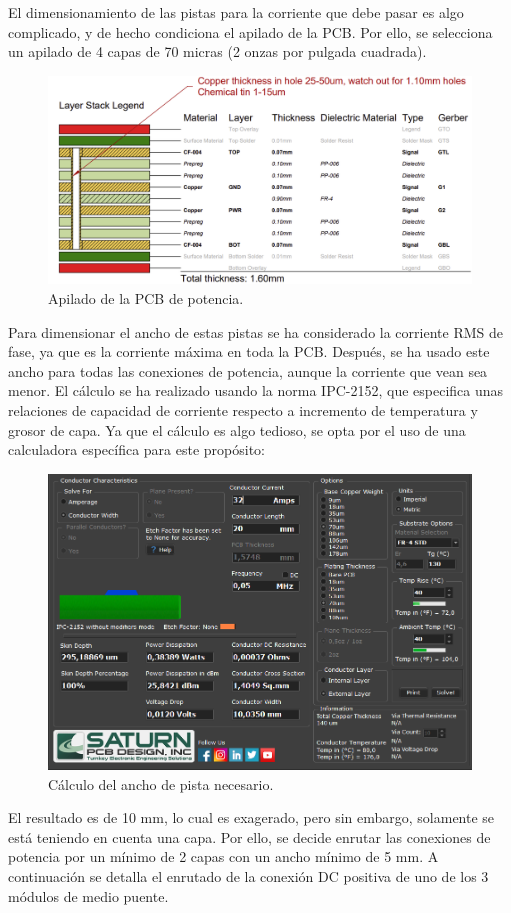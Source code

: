 El dimensionamiento de las pistas para la corriente que debe pasar es algo complicado, y de hecho condiciona el apilado de la PCB. Por ello, se selecciona un apilado de 4 capas de 70 micras (2 onzas por pulgada cuadrada).

\begin{figure}[H]
	\centering
	\includegraphics[width=0.7\linewidth]{fig/stackup_power}
	\caption{Apilado de la PCB de potencia.}
\end{figure}

Para dimensionar el ancho de estas pistas se ha considerado la corriente RMS de fase, ya que es la corriente máxima en toda la PCB. Después, se ha usado este ancho para todas las conexiones de potencia, aunque la corriente que vean sea menor. El cálculo se ha realizado usando la norma IPC-2152, que especifica unas relaciones de capacidad de corriente respecto a incremento de temperatura y grosor de capa. Ya que el cálculo es algo tedioso, se opta por el uso de una calculadora específica para este propósito:

\begin{figure}[H]
	\centering
	\includegraphics[width=0.7\linewidth]{fig/width}
	\caption{Cálculo del ancho de pista necesario.}
\end{figure}

El resultado es de 10 mm, lo cual es exagerado, pero sin embargo, solamente se está teniendo en cuenta una capa. Por ello, se decide enrutar las conexiones de potencia por un mínimo de 2 capas con un ancho mínimo de 5 mm. A continuación se detalla el enrutado de la conexión DC positiva de uno de los 3 módulos de medio puente.

